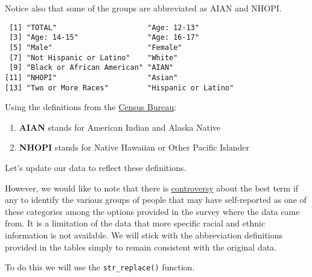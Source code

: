 \documentclass[
]{article}
\newenvironment{Shaded}{\begin{snugshade}}{\end{snugshade}}
\newcommand{\KeywordTok}[1]{\textcolor[rgb]{0.13,0.29,0.53}{\textbf{#1}}}
\newcommand{\NormalTok}[1]{#1}
\newcommand{\OperatorTok}[1]{\textcolor[rgb]{0.81,0.36,0.00}{\textbf{#1}}}
\newcommand{\StringTok}[1]{\textcolor[rgb]{0.31,0.60,0.02}{#1}}
\providecommand{\tightlist}{%
  \setlength{\itemsep}{0pt}\setlength{\parskip}{0pt}}
\begin{document}
Notice also that some of the groups are abbreviated as AIAN and NHOPI.

\begin{Shaded}
\end{Shaded}

\begin{verbatim}
 [1] "TOTAL"                     "Age: 12-13"               
 [3] "Age: 14-15"                "Age: 16-17"               
 [5] "Male"                      "Female"                   
 [7] "Not Hispanic or Latino"    "White"                    
 [9] "Black or African American" "AIAN"                     
[11] "NHOPI"                     "Asian"                    
[13] "Two or More Races"         "Hispanic or Latino"       
\end{verbatim}

Using the definitions from the
\href{https://www.census.gov/programs-surveys/cps/data/data-tools/cps-table-creator-help/race-definitions.html\#:~:text=NHOPI\%20Alone\%20\%E2\%80\%93\%20NHOPI\%20alone\%20refers,not\%20report\%20any\%20other\%20race.}{Census
Bureau}:

\begin{enumerate}
\def\labelenumi{\arabic{enumi}.}
\tightlist
\item
  \textbf{AIAN} stands for American Indian and Alaska Native\\
\item
  \textbf{NHOPI} stands for Native Hawaiian or Other Pacific Islander
\end{enumerate}

Let's update our data to reflect these definitions.

However, we would like to note that there is
\href{https://en.wikipedia.org/wiki/Native_American_name_controversy}{controversy}
about the best term if any to identify the various groups of people that
may have self-reported as one of these categories among the options
provided in the survey where the data came from. It is a limitation of
the data that more specific racial and ethnic information is not
available. We will stick with the abbreviation definitions provided in
the tables simply to remain consistent with the original data.

To do this we will use the \texttt{str\_replace()} function.
\end{document}
